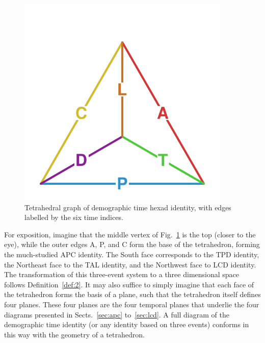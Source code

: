 \documentclass[12pt,oneside,a4paper]{article} %
\theoremstyle{definition}
\begin{document}
\begin{figure}[h!]
\centering
\caption{Tetrahedral graph of demographic time hexad identity, with edges
labelled by the six time indices.}
\label{fig:tet}
\includegraphics[width=4in]{Figures/TetraHedronEdgesOnly.pdf}%
\end{figure}

For exposition, imagine that the middle vertex of Fig.~\ref{fig:tet} is the
top (closer to the eye), while the outer edges A, P, and C form the
base of the tetrahedron, forming the much-studied APC identity.
The South face corresponds to the TPD identity,
the Northeast face to the TAL identity, and the
Northwest face to LCD identity. The transformation of this three-event
system to a three dimensional space follows Definition~\ref{def:2}.
It may also suffice to simply imagine that each face of the tetrahedron forms
the basis of a plane, such that the tetrahedron itself defines four planes. These four planes are the four temporal planes that underlie
the four diagrams presented in Sects.~\ref{sec:apc} to~\ref{sec:lcd}. A full
diagram of the demographic time identity (or any identity based on three events)
conforms in this way with the geometry of a tetrahedron.
\end{document}
